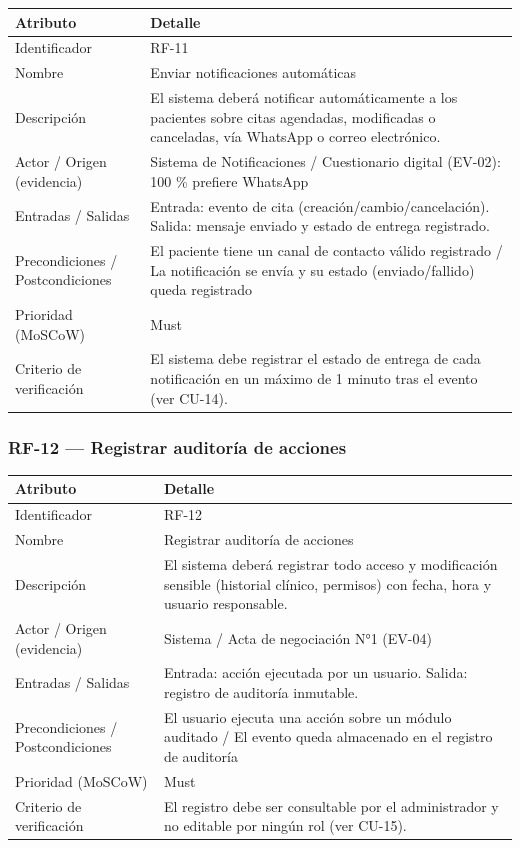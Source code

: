 \documentclass[11pt,a4paper]{article}
\begin{document}
	\begin{longtable}{p{} p{}}
		
		\toprule
		\textbf{Atributo} & \textbf{Detalle} \\
		\midrule
		\endhead
		
		Identificador & RF-11 \\
		Nombre & Enviar notificaciones automáticas \\
		Descripción & El sistema deberá notificar automáticamente a los pacientes sobre citas agendadas, modificadas o canceladas, vía WhatsApp o correo electrónico. \\
		Actor / Origen (evidencia) & Sistema de Notificaciones / Cuestionario digital (EV-02): 100 \% prefiere WhatsApp \\
		Entradas / Salidas & Entrada: evento de cita (creación/cambio/cancelación). Salida: mensaje enviado y estado de entrega registrado. \\
		Precondiciones / Postcondiciones & El paciente tiene un canal de contacto válido registrado / La notificación se envía y su estado (enviado/fallido) queda registrado \\
		Prioridad (MoSCoW) & Must \\
		Criterio de verificación & El sistema debe registrar el estado de entrega de cada notificación en un máximo de 1 minuto tras el evento (ver CU-14). \\
		\bottomrule
	\end{longtable}
	
	\subsubsection{RF-12 --- Registrar auditoría de acciones}
	
	\begin{longtable}{p{} p{}}
		
		\toprule
		\textbf{Atributo} & \textbf{Detalle} \\
		\midrule
		\endhead
		
		Identificador & RF-12 \\
		Nombre & Registrar auditoría de acciones \\
		Descripción & El sistema deberá registrar todo acceso y modificación sensible (historial clínico, permisos) con fecha, hora y usuario responsable. \\
		Actor / Origen (evidencia) & Sistema / Acta de negociación N°1 (EV-04) \\
		Entradas / Salidas & Entrada: acción ejecutada por un usuario. Salida: registro de auditoría inmutable. \\
		Precondiciones / Postcondiciones & El usuario ejecuta una acción sobre un módulo auditado / El evento queda almacenado en el registro de auditoría \\
		Prioridad (MoSCoW) & Must \\
		Criterio de verificación & El registro debe ser consultable por el administrador y no editable por ningún rol (ver CU-15). \\
		\bottomrule
	\end{longtable}
	
\end{document}
